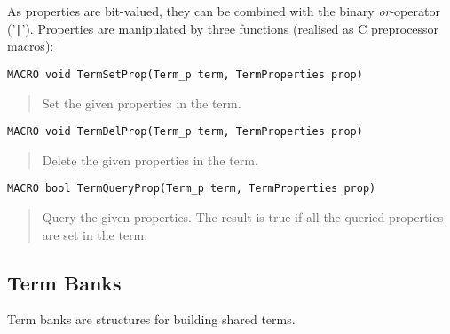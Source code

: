 As properties are bit-valued, they can be combined with the binary
\emph{or}-operator ('\texttt{|}').  Properties are manipulated by
three functions (realised as C preprocessor macros):

\begin{verbatim}
MACRO void TermSetProp(Term_p term, TermProperties prop)
\end{verbatim}
\begin{quote}
  Set the given properties in the term.
\end{quote}

\begin{verbatim}
MACRO void TermDelProp(Term_p term, TermProperties prop)
\end{verbatim}
\begin{quote}
  Delete the given properties in the term.
\end{quote}
\begin{verbatim}
MACRO bool TermQueryProp(Term_p term, TermProperties prop)
\end{verbatim}
\begin{quote}
  Query the given properties. The result is true if all the queried
  properties are set in the term.
\end{quote}


\subsection{Term Banks}
\label{sec:terms:banks}

Term banks are structures for building shared terms. 




